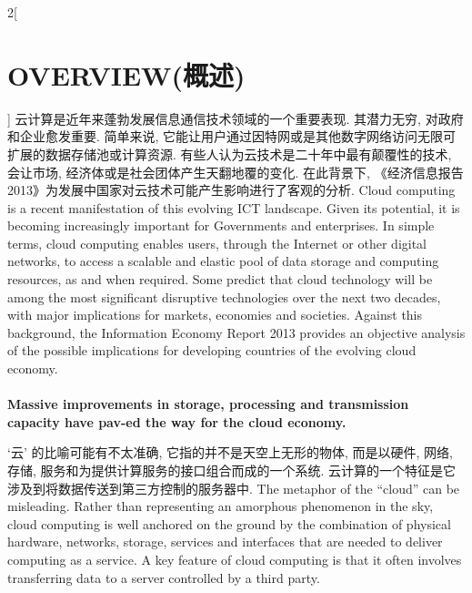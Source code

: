\documentclass[a4paper, UTF8, 12pt]{article}
\begin{document}
\begin{paracol}{2}[\section{OVERVIEW(概述)}]
    \switchcolumn*
    云计算是近年来蓬勃发展信息通信技术领域的一个重要表现. 其潜力无穷, 对政府和企业愈发重要. 简单来说, 它能让用户通过因特网或是其他数字网络访问无限可扩展的数据存储池或计算资源. 有些人认为云技术是二十年中最有颠覆性的技术, 会让市场, 经济体或是社会团体产生天翻地覆的变化. 在此背景下, 《经济信息报告2013》为发展中国家对云技术可能产生影响进行了客观的分析.
    \switchcolumn
    Cloud computing is a recent manifestation of this evolving ICT landscape. Given its potential, it is becoming increasingly important for Governments and enterprises. In simple terms, cloud computing enables users, through the Internet or other digital networks, to access a scalable and elastic pool of data storage and computing resources, as and when required. Some predict that cloud technology will be among the most significant disruptive technologies over the next two decades, with major implications for markets, economies and societies. Against this background, the Information Economy Report 2013 provides an objective analysis of the possible implications for developing countries of the evolving cloud economy.
    
    \switchcolumn*
    \paragraph{} 
    \switchcolumn
    \paragraph{}
    {\bfseries Massive improvements in storage, processing and transmission capacity have pav-ed the way for the cloud economy.} 
    
    \switchcolumn*
    `云' 的比喻可能有不太准确, 它指的并不是天空上无形的物体, 而是以硬件, 网络, 存储, 服务和为提供计算服务的接口组合而成的一个系统. 云计算的一个特征是它涉及到将数据传送到第三方控制的服务器中.
    \switchcolumn
    The metaphor of the “cloud” can be misleading. Rather than representing an amorphous phenomenon in the sky, cloud computing is well anchored on the ground by the combination of physical hardware, networks, storage, services and interfaces that are needed to deliver computing as a service. A key feature of cloud computing is that it often involves transferring data to a server controlled by a third party. 


\end{paracol}
\end{document}
